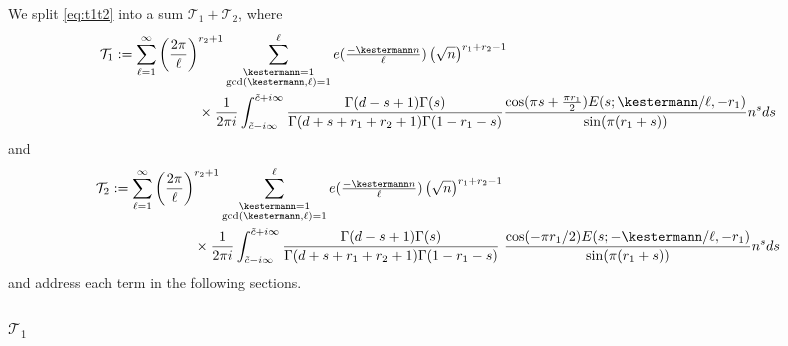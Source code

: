 \documentclass[]{article}
\newcommand{\sumk}{\sum_{\substack{\kestermann = 1 \\ \gcd(\kestermann,\ell) = 1}}^\ell}
\begin{document}
We split \eqref{eq:t1t2} into a sum $\mathcal{T}_1 + \mathcal{T}_2$, 
where 
\begin{equation}\label{def:t1}
\begin{split}
\mathcal{T}_1 &:=  \sum_{\ell=1}^\infty   \left( \frac{2 \pi }{\ell} \right)^{r_2+1}   \sumk e(\tfrac{-\kestermann n}{\ell}) \left(  \sqrt{n}  \right)^{r_1+r_2-1}  \\
&      \ \ \ \ \ \ \ \ \  \ \ \ \ \ \  \ \ \  \times  \frac{1}{2 \pi i}\int_{\tilde c-i \infty}^{\tilde c+i \infty} \frac{   \Gamma(d-s+1)   \Gamma(s)  }{\Gamma (d+s+r_1+r_2+1) \Gamma(1-r_1-s)  }          \frac{\cos(\pi s + \frac{\pi r_1}{2}) E(s;\kestermann/\ell,-r_1)  }{\sin(\pi (r_1+s))}  n^{s}  ds 
\end{split}    
\end{equation}
and 
\begin{equation}
\begin{split}\label{def:t2}
    \mathcal{T}_2 &:=  \sum_{\ell=1}^\infty   \left( \frac{2 \pi }{\ell} \right)^{r_2+1}   \sumk e(\tfrac{-\kestermann n}{\ell}) \left(  \sqrt{n}  \right)^{r_1+r_2-1}  \\
&      \ \ \ \ \ \ \ \ \  \ \ \ \ \ \   \ \ \  \times      \frac{1}{2 \pi i}  \int_{\tilde c-i \infty}^{\tilde c+i \infty} \frac{   \Gamma(d-s+1)   \Gamma(s)  }{\Gamma (d+s+r_1+r_2+1) \Gamma(1-r_1-s)  }  \ \frac{ \cos(- \pi r_1/2 ) E(s;-\kestermann/\ell,-r_1)  }{\sin(\pi (r_1+s))}  n^{s}  ds 
\end{split}
\end{equation}
and address each term in the following sections.


\subsubsection{$\mathcal{T}_1$}\label{sec:T1}
\end{document}
